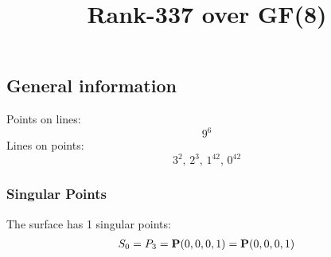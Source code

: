 \documentclass{article}
\newcommand\setTBstruts{\def\T{\rule{0pt}{2.6ex}}%
\def\B{\rule[-1.2ex]{0pt}{0pt}}}
\newcommand{\bP}{{\bf P}}
\begin{document}
 
\setTBstruts



{\allowdisplaybreaks%






\title{Rank-337 over GF(8)}
\author{}%
\maketitle%
%
{}



\subsection*{General information}
Points on lines:
$$
9^6$$
Lines on points:
$$
3^2,\,2^3,\,1^{42},\,0^{42}$$
\subsubsection*{Singular Points}
The surface has 1 singular points:\\
\begin{align*}
S_{0} &= P_{3}=\bP(0, 0, 0, 1) = \bP(0, 0, 0, 1)\\
\end{align*}
}
\end{document}
